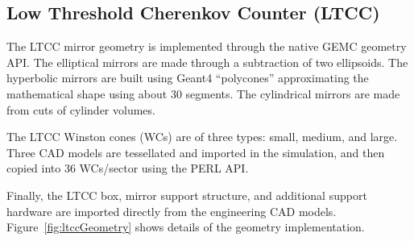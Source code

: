 \subsection{Low Threshold Cherenkov Counter (LTCC)}

The LTCC mirror geometry is implemented through the native GEMC geometry API. The elliptical mirrors are made
through a subtraction of two ellipsoids. The hyperbolic mirrors are built using Geant4 ``polycones'' approximating the
mathematical shape using about 30 segments. The cylindrical mirrors are made from cuts of cylinder volumes.

The LTCC Winston cones (WCs) are of three types: small, medium, and large. Three CAD models are tessellated and
imported in the simulation, and then copied into 36 WCs/sector using the PERL API.

Finally, the LTCC box, mirror support structure, and additional support hardware are imported directly from
the engineering CAD models. Figure~\ref{fig:ltccGeometry} shows details of the geometry implementation.


